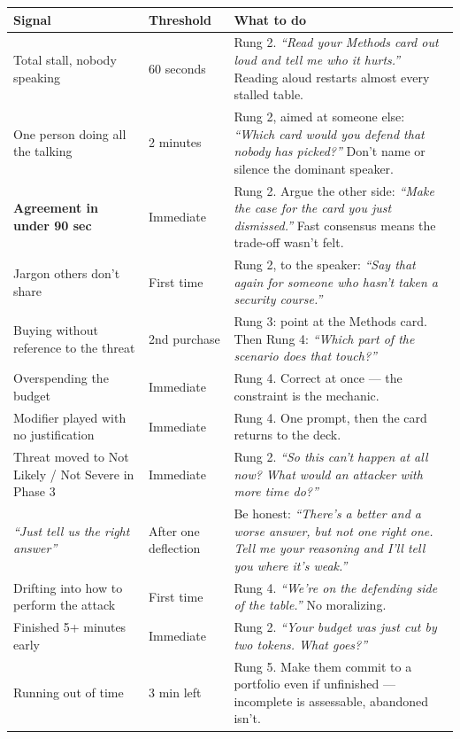 \documentclass[9pt,letterpaper]{extarticle}
\newcommand{\say}[1]{\textit{``#1''}}
\begin{document}
\vspace{0.3em}
\small
\begin{tabularx}{\textwidth}{@{}p{4.4cm} p{1.9cm} X@{}}
\toprule
\textbf{Signal} & \textbf{Threshold} & \textbf{What to do} \\
\midrule
Total stall, nobody speaking & 60 seconds & Rung 2. \say{Read your Methods card out loud and tell me who it hurts.} Reading aloud restarts almost every stalled table. \\
One person doing all the talking & 2 minutes & Rung 2, aimed at someone else: \say{Which card would you defend that nobody has picked?} Don't name or silence the dominant speaker. \\
\textbf{Agreement in under 90 sec} & Immediate & Rung 2. Argue the other side: \say{Make the case for the card you just dismissed.} Fast consensus means the trade-off wasn't felt. \\
Jargon others don't share & First time & Rung 2, to the speaker: \say{Say that again for someone who hasn't taken a security course.} \\
Buying without reference to the threat & 2nd purchase & Rung 3: point at the Methods card. Then Rung 4: \say{Which part of the scenario does that touch?} \\
Overspending the budget & Immediate & Rung 4. Correct at once --- the constraint is the mechanic. \\
Modifier played with no justification & Immediate & Rung 4. One prompt, then the card returns to the deck. \\
Threat moved to Not Likely / Not Severe in Phase 3 & Immediate & Rung 2. \say{So this can't happen at all now? What would an attacker with more time do?} \\
\say{Just tell us the right answer} & After one deflection & Be honest: \say{There's a better and a worse answer, but not one right one. Tell me your reasoning and I'll tell you where it's weak.} \\
Drifting into how to perform the attack & First time & Rung 4. \say{We're on the defending side of the table.} No moralizing. \\
Finished 5+ minutes early & Immediate & Rung 2. \say{Your budget was just cut by two tokens. What goes?} \\
Running out of time & 3 min left & Rung 5. Make them commit to a portfolio even if unfinished --- incomplete is assessable, abandoned isn't. \\
\bottomrule
\end{tabularx}
\normalsize
\end{document}

